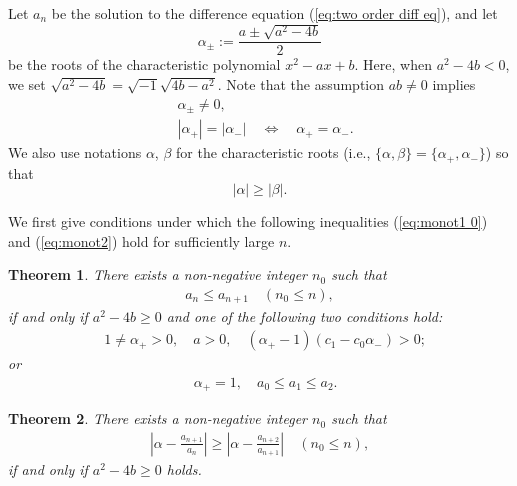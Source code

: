 \documentclass[a4paper,11pt,reqno]{amsart}
\theoremstyle{plain}
\newtheorem{thm}{Theorem}[section]
\theoremstyle{definition}
\begin{document}
Let $a_{n}$ be the solution to the difference equation (\ref{eq:two order diff eq}), and let 
$$
\alpha _{\pm }:=\frac{a\pm \sqrt{a^{2}-4b}}{2}
$$
be the roots of the characteristic polynomial $x^{2}-ax+b$. 
Here, when $a^{2}-4b<0$, we set $\sqrt{a^{2}-4b}=\sqrt{-1}\sqrt{4b-a^{2}}$. 
Note that the assumption $ab\not=0$ implies 
\begin{align}
\label{eq:eq char root nonzero}
&\alpha _{\pm}\not=0,\\
\label{eq:eq cond char root}
&|\alpha _{+}|=|\alpha _{-}| \quad \Leftrightarrow \quad \alpha _{+}=\alpha _{-} .
\end{align}
We also use notations $\alpha$, $\beta$ for the characteristic roots 
(i.e., $\{\alpha ,\beta\}=\{\alpha _{+},\alpha _{-}\}$) 
so that 
$$
|\alpha |\geq |\beta | .
$$

We first give conditions under which 
the following inequalities (\ref{eq:monot1 0}) and (\ref{eq:monot2}) hold for sufficiently large $n$. 
\begin{thm}
\label{thm:monot1-2}
There exists a non-negative integer $n_{0}$ such that 
\begin{align}
\label{eq:monot1 0}
a_{n}\leq a_{n+1} \quad (n_{0}\leq n), 
\end{align}
if and only if $a^{2}-4b\geq 0$ and one of the following two conditions hold: 
\begin{align}
\label{eq:monotonic cond 1}
& 1\not=\alpha _{+}>0,\quad a>0, \quad (\alpha _{+}-1)(c_{1}-c_{0}\alpha _{-})> 0;
\end{align}
or 
\begin{align}
\label{eq:monotonic cond 2}
& \alpha _{+}=1, \quad a_{0}\leq a_{1}\leq a_{2}.
\end{align}
\end{thm}

\begin{thm}
\label{thm:monot2-2}
There exists a non-negative integer $n_{0}$ such that 
\begin{align}
\label{eq:monot2}
\left|\alpha -\frac{a_{n+1}}{a_{n}}\right| \geq \left|\alpha -\frac{a_{n+2}}{a_{n+1}}\right| 
\quad (n_{0}\leq n),
\end{align}
if and only if $a^{2}-4b\geq 0$ holds. 
\end{thm}
\end{document}
